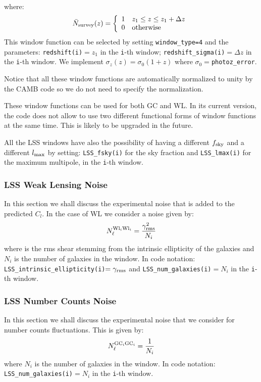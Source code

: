 \documentclass[prd,nofootinbib,showpacs]{revtex4}
\newcommand{\code}[1]{\lstinline|#1|}
\begin{document}
\begin{itemize}
\begin{align}
\end{align}
%
where:
%
\begin{align}
\bar{N}_{\rm survey}(z) = \left\{
\begin{array}{ll}
      1 & z_1 \leq z \leq z_1+\Delta z \\
      0 & \mbox{otherwise} \\
\end{array} 
\right.
\end{align}
%
This window function can be selected by setting \code{window_type=4} and the parameters: \code{redshift(i)}$=z_1$ in the \code{i}-th window; \code{redshift_sigma(i)}$=\Delta z$ in the \code{i}-th window. We implement $\sigma_z(z) = \sigma_0(1+z)$ where $\sigma_0=$\code{photoz_error}.
\end{itemize}
%

Notice that all these window functions are automatically normalized to unity by the CAMB code so we do not need to specify the normalization.

These window functions can be used for both GC and WL. In its current version, the code does not allow to use two different functional forms of window functions at the same time. This is likely to be upgraded in the future.

All the LSS windows have also the possibility of having a different $f_{\rm sky}$ and a different $l_{\rm max}$ by setting: \code{LSS_fsky(i)} for the sky fraction and \code{LSS_lmax(i)} for the maximum multipole, in the \code{i}-th window.

%
\subsubsection{LSS Weak Lensing Noise}
%
In this section we shall discuss the experimental noise that is added to the predicted $C_{l}$. In the case of WL we consider a noise given by:
%
\begin{align} \label{Eq:WLNoise}
N_{\ell}^{ {\rm Wl}_i {\rm Wl}_i } = \frac{\gamma_{\rm rms}^2}{N_i}
\end{align}
%
where is the rms shear stemming from the intrinsic ellipticity of the galaxies and $N_i$ is the number of galaxies in the window.
In code notation: \code{LSS_intrinsic_ellipticity(i)}$=\gamma_{\rm rms}$ and \code{LSS_num_galaxies(i)}$=N_i$ in the \code{i}-th window.
%
\subsubsection{LSS Number Counts Noise}
%
In this section we shall discuss the experimental noise that we consider for number counts fluctuations. This is given by:
%
\begin{align} \label{Eq:GCNoise}
N_{\ell}^{ {\rm GC}_i {\rm GC}_i } = \frac{1}{N_i}
\end{align}
%
where $N_i$ is the number of galaxies in the window.
In code notation: \code{LSS_num_galaxies(i)}$=N_i$ in the \code{i}-th window.
\end{document}
